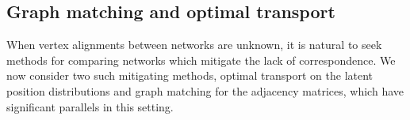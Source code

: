 \documentclass[12pt]{article}
\theoremstyle{definition}
\newcommand{\bA}{\mathbf{A}}
\begin{document}

\subsection{Graph matching and optimal transport}\label{sec:Mirrors_Matching_Transport}
When vertex alignments between networks are unknown, it is natural to seek methods for comparing networks which mitigate the lack of correspondence. We now consider two such mitigating methods, optimal transport on the latent position distributions and graph matching for the adjacency matrices, which have significant parallels in this setting. 
\end{document}
